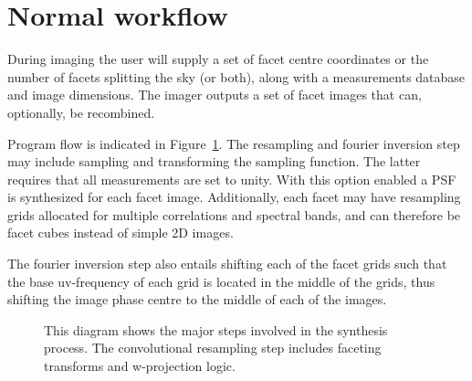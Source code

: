 \section{Normal workflow}
During imaging the user will supply a set of facet centre coordinates or the number of facets splitting the sky (or both), along with a measurements database and image dimensions. The imager outputs a 
set of facet images that can, optionally, be recombined.

Program flow is indicated in Figure~\ref{fig_workflow}. The resampling and fourier inversion step may include sampling and transforming the sampling function.
The latter requires that all measurements are set to unity. With this option enabled a PSF is synthesized for each facet image. Additionally, 
each facet may have resampling grids allocated for multiple correlations and spectral bands, and can therefore be facet cubes 
instead of simple 2D images. 

The fourier inversion step also entails shifting each of the facet grids such that the base uv-frequency of each grid
is located in the middle of the grids, thus shifting the image phase centre to the middle of each of the images.
\begin{figure}[ht!]
 \begin{mdframed}
 \centering
 \caption[Imaging workflow]{This diagram shows the major steps involved in the synthesis process. The convolutional resampling step includes
 faceting transforms and w-projection logic.}
 \label{fig_workflow}
 \end{mdframed}
\end{figure}
